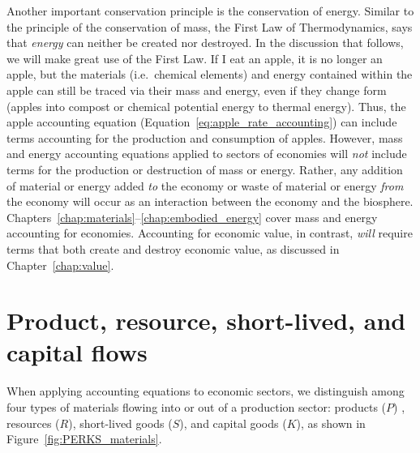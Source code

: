 Another important conservation principle is the conservation of energy.
Similar to the principle of the conservation of mass,
the First Law of Thermodynamics,
says that \emph{energy} can neither be created nor destroyed. 
In the discussion that follows, we will make great use 
of the First Law.
If I eat an apple, it is no longer an apple, 
but the materials (i.e.\ chemical elements) and energy contained
within the apple can still be traced via their mass and energy,
even if they change form (apples into compost or 
chemical potential energy to thermal energy).
Thus, the apple accounting equation
(Equation~\ref{eq:apple_rate_accounting}) can include
terms accounting for the production and consumption of apples. 
However, mass and energy accounting equations applied to 
sectors of economies will \emph{not} include terms for the 
production or destruction of mass or energy. 
Rather, any addition of material or energy added \emph{to} the economy
or waste of material or energy \emph{from} the economy
will occur as an interaction between the economy and the biosphere.
Chapters~\ref{chap:materials}--\ref{chap:embodied_energy} cover mass and energy
accounting for economies.
Accounting for economic value, in contrast, 
\emph{will} require terms that both create and destroy economic value,
as discussed in Chapter~\ref{chap:value}.


\section{Product, resource, short-lived, and capital flows}

When applying accounting equations to economic sectors,
we distinguish among four types of
materials flowing into or out of a production sector: 
products ($P$) , 
resources ($R$),
short-lived goods ($S$),
and capital goods ($K$), 
as shown in Figure~\ref{fig:PERKS_materials}.

